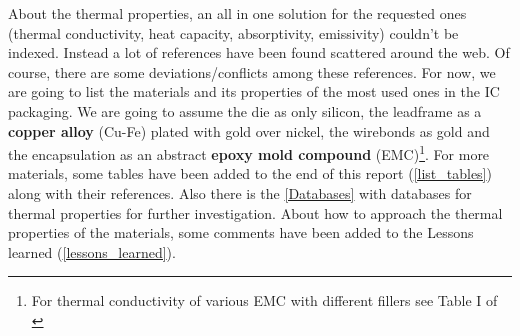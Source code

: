 \documentclass[final]{cubedoc}
\begin{document}
	
	About the thermal properties, an all in one solution for the requested ones (thermal conductivity, heat capacity, absorptivity, emissivity) couldn't be indexed. Instead a lot of references have been found scattered around the web. Of course, there are some deviations/conflicts among these references. For now, we are going to list the materials and its properties of the most used ones in the IC packaging. We are going to assume the die as only silicon, the leadframe as a \textbf{copper alloy} (Cu-Fe) plated with gold over nickel, the wirebonds as gold and the encapsulation as an abstract \textbf{epoxy mold compound} (EMC)\footnote{For thermal conductivity of various EMC with different fillers see Table I of \cite{Cheng2018StudyOT}}. For more materials, some tables have been added to the end of this report (\cref{list_tables}) along with their references. Also there is the \cref{Databases} with databases for thermal properties for further investigation. About how to approach the thermal properties of the materials, some comments have been added to the Lessons learned (\cref{lessons_learned}).
	
	\begin{table}[h!]
		\centering
		\caption{Material Bulk properties of QFP}
		\label{tab:my_label}
	\end{table}
	
\end{document}
